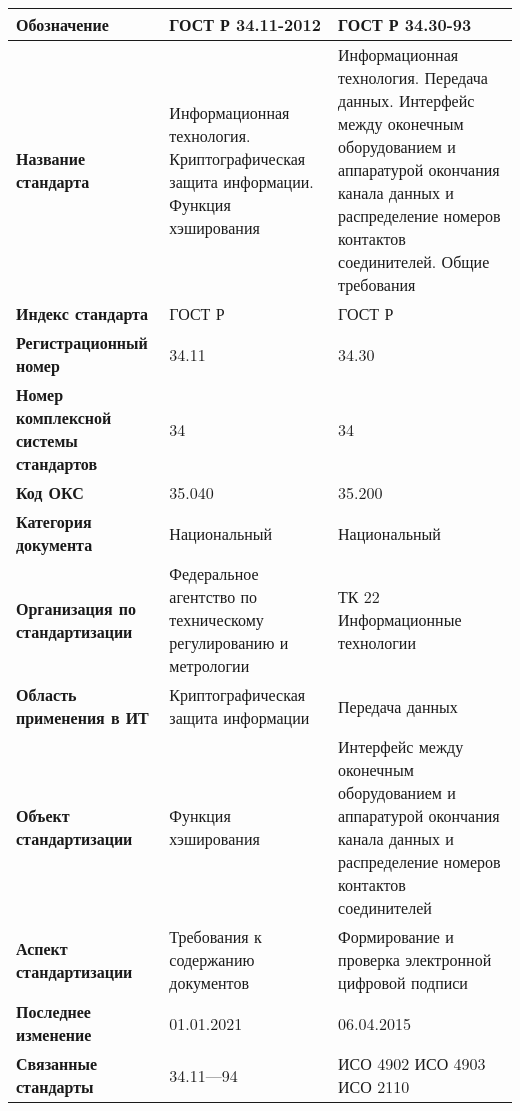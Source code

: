 \begin{table}[h!tp]
	\centering
	\caption{}
	\label{table:national}
	\begin{tabular}{|p{10em}|p{12em}|p{12em}|}
		\hline
		\textbf{Обозначение}
			& \textbf{ГОСТ Р 34.11-2012} & \textbf{ГОСТ Р 34.30-93} \\ \hline
		\textbf{Название стандарта}
			& Информационная технология. Криптографическая защита информации. Функция хэширования
			& Информационная технология. Передача данных. Интерфейс между оконечным оборудованием и аппаратурой окончания канала данных и распределение номеров контактов соединителей. Общие требования \\ \hline
		\textbf{Индекс стандарта}
			& ГОСТ Р & ГОСТ Р \\ \hline
		\textbf{Регистрационный номер}
			& 34.11 & 34.30 \\ \hline
		\textbf{Номер комплексной системы стандартов}
			& 34 & 34 \\ \hline
		\textbf{Код ОКС}
			& 35.040 & 35.200 \\ \hline
		\textbf{Категория документа}
			& Национальный & Национальный \\ \hline
		\textbf{Организация по стандартизации}
			& Федеральное агентство по техническому регулированию и метрологии
			& ТК 22 Информационные технологии \\ \hline
		\textbf{Область применения в ИТ}
			& Криптографическая защита информации
			& Передача данных \\ \hline
		\textbf{Объект стандартизации}
			& Функция хэширования
			& Интерфейс между оконечным оборудованием и аппаратурой окончания канала данных и распределение номеров контактов соединителей \\ \hline
		\textbf{Аспект стандартизации}
			& Требования к содержанию документов
			& Формирование и проверка электронной цифровой подписи \\ \hline
		\textbf{Последнее изменение}
			& 01.01.2021 & 06.04.2015 \\ \hline
		\textbf{Связанные стандарты}
			& 34.11—94
			& ИСО 4902 ИСО 4903 ИСО 2110 \\ \hline
	\end{tabular}
\end{table}

